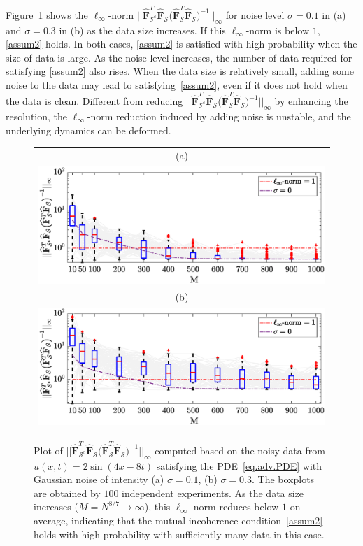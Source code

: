 \documentclass[a4paper,11pt]{article}
\theoremstyle{definition}
\begin{document}
Figure~\ref{fig.MIPtransport} shows the $\ell_\infty$-norm  $||\widehat{\mathbf{F}}_{\mathcal{S}^c}^T\widehat{\mathbf{F}}_{\mathcal{S}}\big(\widehat{\mathbf{F}}_{\mathcal{S}}^T\widehat{\mathbf{F}}_{\mathcal{S}}\big)^{-1}||_\infty$ for noise level $\sigma=0.1$ in (a) and $\sigma=0.3$ in (b) as the data size increases. If this $\ell_\infty$-norm is below $1$, \eqref{assum2} holds. In both cases, \eqref{assum2} is satisfied with high probability when the size of data is large.   As the noise level increases, the number of data required for satisfying  \eqref{assum2} also rises.  When the data size is relatively small, adding some noise to the data may lead to  satisfying~\eqref{assum2}, even if it does not hold when the data is clean. Different from reducing $||\widehat{\mathbf{F}}_{\mathcal{S}^c}^T\widehat{\mathbf{F}}_{\mathcal{S}}\big(\widehat{\mathbf{F}}_{\mathcal{S}}^T\widehat{\mathbf{F}}_{\mathcal{S}}\big)^{-1}||_\infty$ by  enhancing the resolution, the $\ell_\infty$-norm reduction induced by adding noise is unstable, and the underlying dynamics can be deformed.
\begin{figure}
\centering
\begin{tabular}{c}
(a)\\
\includegraphics[scale=0.37]{Figures/transportMIP_0_1.eps}\\
(b)\\
\includegraphics[scale=0.37]{Figures/transportMIP_0_3.eps}
\end{tabular}
\caption{Plot of $||\widehat{\mathbf{F}}_{\mathcal{S}^c}^T\widehat{\mathbf{F}}_{\mathcal{S}}\big(\widehat{\mathbf{F}}_{\mathcal{S}}^T\widehat{\mathbf{F}}_{\mathcal{S}}\big)^{-1}||_\infty$  computed based on the noisy data from $u(x,t)=2\sin(4x-8t)$ satisfying the PDE~\eqref{eq.adv.PDE} with Gaussian noise of intensity (a) $\sigma=0.1$, (b) $\sigma=0.3$. The boxplots are obtained by $100$ independent experiments. As the data size increases ($M=N^{8/7}\to\infty$), this $\ell_\infty$-norm reduces below $1$ on average, indicating that the mutual incoherence condition~\eqref{assum2} holds with high probability with sufficiently many data in this case. }\label{fig.MIPtransport}
\end{figure}
\end{document}

